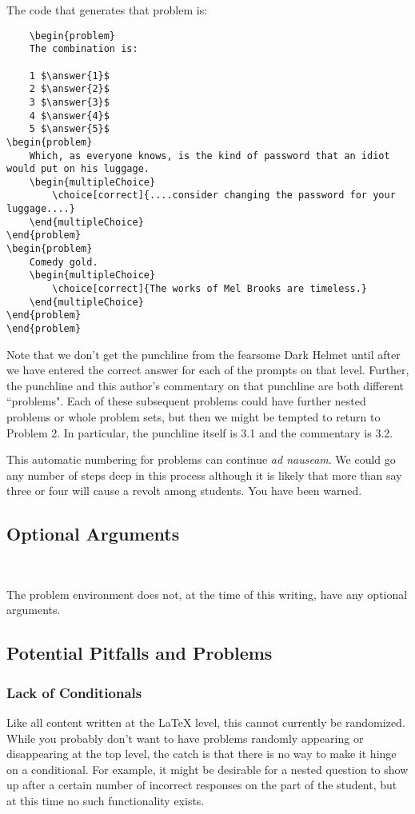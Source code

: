 \documentclass{ximera}
\begin{document}
The code that generates that problem is:


\begin{verbatim}
    \begin{problem}
    The combination is:

    1 $\answer{1}$
    2 $\answer{2}$
    3 $\answer{3}$
    4 $\answer{4}$
    5 $\answer{5}$
\begin{problem}
    Which, as everyone knows, is the kind of password that an idiot would put on his luggage.
    \begin{multipleChoice}
        \choice[correct]{....consider changing the password for your luggage....}
    \end{multipleChoice}
\end{problem}
\begin{problem}
    Comedy gold.
    \begin{multipleChoice}
        \choice[correct]{The works of Mel Brooks are timeless.}
    \end{multipleChoice}
\end{problem}
\end{problem}

\end{verbatim}

Note that we don't get the punchline from the fearsome Dark Helmet until after we have entered the correct answer for each of the prompts on that level. Further, the punchline and this author's commentary on that punchline are both different ``problems".  Each of these subsequent problems could have further nested problems or whole problem sets, but then we might be tempted to return to Problem 2.  In particular, the punchline itself is 3.1 and the commentary is 3.2. 

This automatic numbering for problems can continue \textit{ad nauseam}.  We could go any number of steps deep in this process although it is likely that more than say three or four will cause a revolt among students.  You have been warned.

\subsection{Optional Arguments}\

The problem environment does not, at the time of this writing, have any optional arguments.

\subsection{Potential Pitfalls and Problems}
\subsubsection{Lack of Conditionals}
Like all content written at the LaTeX level, this cannot currently be randomized.  While you probably don't want to have problems randomly appearing or disappearing at the top level, the catch is that there is no way to make it hinge on a conditional.  For example, it might be desirable for a nested question to show up after a certain number of incorrect responses on the part of the student, but at this time no such functionality exists.
\end{document}
